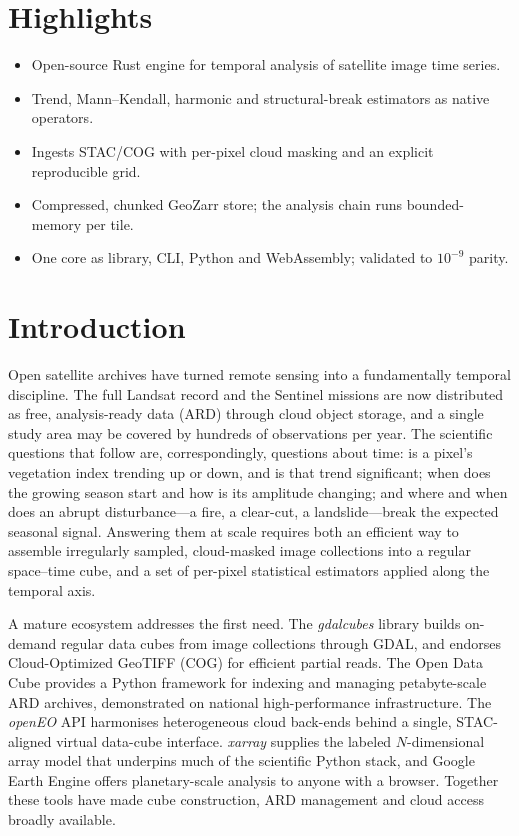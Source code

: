\documentclass[review]{elsarticle}
\begin{document}
\section*{Highlights}
\begin{itemize}\setlength{\itemsep}{0pt}
  \item Open-source Rust engine for temporal analysis of satellite image time series.
  \item Trend, Mann--Kendall, harmonic and structural-break estimators as native operators.
  \item Ingests STAC/COG with per-pixel cloud masking and an explicit reproducible grid.
  \item Compressed, chunked GeoZarr store; the analysis chain runs bounded-memory per tile.
  \item One core as library, CLI, Python and WebAssembly; validated to $10^{-9}$ parity.
\end{itemize}

\linenumbers

\section{Introduction}
\label{sec:intro}

Open satellite archives have turned remote sensing into a fundamentally temporal
discipline. The full Landsat record and the Sentinel missions are now
distributed as free, analysis-ready data (ARD) through cloud object storage, and
a single study area may be covered by hundreds of observations per year. The
scientific questions that follow are, correspondingly, questions about time: is a
pixel's vegetation index trending up or down, and is that trend significant; when
does the growing season start and how is its amplitude changing; and where and
when does an abrupt disturbance---a fire, a clear-cut, a landslide---break the
expected seasonal signal. Answering them at scale requires both an efficient way
to assemble irregularly sampled, cloud-masked image collections into a regular
space--time cube, and a set of per-pixel statistical estimators applied along the
temporal axis.

A mature ecosystem addresses the first need. The \emph{gdalcubes} library
\citep{appel2019gdalcubes} builds on-demand regular data cubes from image
collections through GDAL, and endorses Cloud-Optimized GeoTIFF (COG) for
efficient partial reads. The Open Data Cube \citep{lewis2017agdc} provides a
Python framework for indexing and managing petabyte-scale ARD archives,
demonstrated on national high-performance infrastructure. The \emph{openEO} API
\citep{schramm2021openeo} harmonises heterogeneous cloud back-ends behind a
single, STAC-aligned virtual data-cube interface. \emph{xarray}
\citep{hoyer2017xarray} supplies the labeled $N$-dimensional array model that
underpins much of the scientific Python stack, and Google Earth Engine
\citep{gorelick2017gee} offers planetary-scale analysis to anyone with a browser.
Together these tools have made cube construction, ARD management and cloud access
broadly available.
\end{document}
